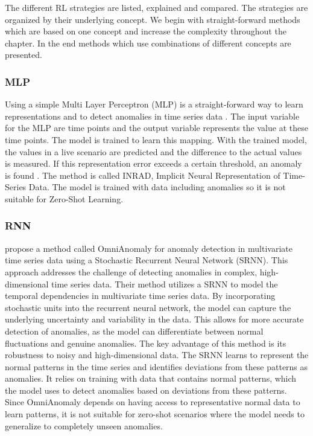 The different RL strategies are listed, explained and compared. The strategies are organized by their underlying concept. We begin with straight-forward methods which are based on one concept and increase the complexity throughout the chapter. In the end methods which use combinations of different concepts are presented.

\subsubsection{MLP}
Using a simple Multi Layer Perceptron (MLP) is a straight-forward way to learn representations and to detect anomalies in time series data . The input variable for the MLP are time points and the output variable represents the value at these time points. The model is trained to learn this mapping. With the trained model, the values in a live scenario are predicted and the difference to the actual values is measured. If this representation error exceeds a certain threshold, an anomaly is found . The method is called INRAD, Implicit Neural Representation of Time-Series Data.
The model is trained with data including anomalies so it is not suitable for Zero-Shot Learning.

\subsubsection{RNN}
 propose a method called OmniAnomaly for anomaly detection in multivariate time series data using a Stochastic Recurrent Neural Network (SRNN). This approach addresses the challenge of detecting anomalies in complex, high-dimensional time series data.
Their method utilizes a SRNN to model the temporal dependencies in multivariate time series data. By incorporating stochastic units into the recurrent neural network, the model can capture the underlying uncertainty and variability in the data. This allows for more accurate detection of anomalies, as the model can differentiate between normal fluctuations and genuine anomalies.
The key advantage of this method is its robustness to noisy and high-dimensional data. The SRNN learns to represent the normal patterns in the time series and identifies deviations from these patterns as anomalies. It relies on training with data that contains normal patterns, which the model uses to detect anomalies based on deviations from these patterns. Since OmniAnomaly depends on having access to representative normal data to learn patterns, it is not suitable for zero-shot scenarios where the model needs to generalize to completely unseen anomalies.

